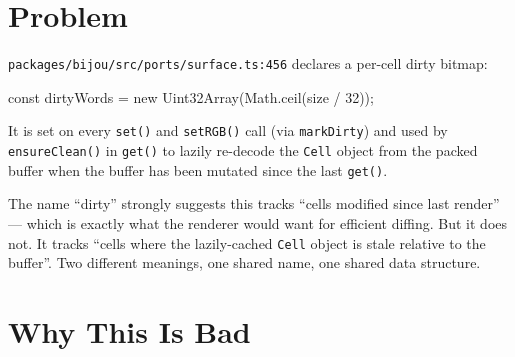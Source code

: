 \section{Problem}\label{record-368-problem}

\texttt{p\allowbreak{}a\allowbreak{}c\allowbreak{}k\allowbreak{}a\allowbreak{}g\allowbreak{}e\allowbreak{}s\allowbreak{}/\allowbreak{}b\allowbreak{}i\allowbreak{}j\allowbreak{}o\allowbreak{}u\allowbreak{}/\allowbreak{}s\allowbreak{}r\allowbreak{}c\allowbreak{}/\allowbreak{}p\allowbreak{}o\allowbreak{}r\allowbreak{}t\allowbreak{}s\allowbreak{}/\allowbreak{}s\allowbreak{}u\allowbreak{}r\allowbreak{}f\allowbreak{}a\allowbreak{}c\allowbreak{}e\allowbreak{}.\allowbreak{}t\allowbreak{}s\allowbreak{}:\allowbreak{}4\allowbreak{}5\allowbreak{}6} declares a per-cell dirty bitmap:

\begin{CodeBlock}
const dirtyWords = new Uint32Array(Math.ceil(size / 32));
\end{CodeBlock}

It is set on every \texttt{s\allowbreak{}e\allowbreak{}t\allowbreak{}(\allowbreak{})} and \texttt{s\allowbreak{}e\allowbreak{}t\allowbreak{}R\allowbreak{}G\allowbreak{}B\allowbreak{}(\allowbreak{})} call (via \texttt{m\allowbreak{}a\allowbreak{}r\allowbreak{}k\allowbreak{}D\allowbreak{}i\allowbreak{}r\allowbreak{}t\allowbreak{}y}) and used by \texttt{e\allowbreak{}n\allowbreak{}s\allowbreak{}u\allowbreak{}r\allowbreak{}e\allowbreak{}C\allowbreak{}l\allowbreak{}e\allowbreak{}a\allowbreak{}n\allowbreak{}(\allowbreak{})} in \texttt{g\allowbreak{}e\allowbreak{}t\allowbreak{}(\allowbreak{})} to lazily re-decode the \texttt{C\allowbreak{}e\allowbreak{}l\allowbreak{}l} object from the packed buffer when the buffer has been mutated since the last \texttt{g\allowbreak{}e\allowbreak{}t\allowbreak{}(\allowbreak{})}.

The name ``dirty'' strongly suggests this tracks ``cells modified since last render'' --- which is exactly what the renderer would want for efficient diffing. But it does not. It tracks ``cells where the lazily-cached \texttt{C\allowbreak{}e\allowbreak{}l\allowbreak{}l} object is stale relative to the buffer''. Two different meanings, one shared name, one shared data structure.

\section{Why This Is Bad}\label{record-368-why-this-is-bad}

